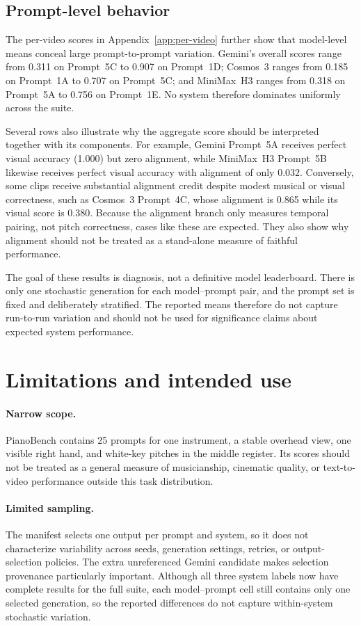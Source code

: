 \documentclass{article}
\begin{document}
\subsection{Prompt-level behavior}

The per-video scores in Appendix~\ref{app:per-video} further show that model-level means conceal large prompt-to-prompt variation. Gemini's overall scores range from 0.311 on Prompt~5C to 0.907 on Prompt~1D; Cosmos~3 ranges from 0.185 on Prompt~1A to 0.707 on Prompt~5C; and MiniMax~H3 ranges from 0.318 on Prompt~5A to 0.756 on Prompt~1E. No system therefore dominates uniformly across the suite.

Several rows also illustrate why the aggregate score should be interpreted together with its components. For example, Gemini Prompt~5A receives perfect visual accuracy (1.000) but zero alignment, while MiniMax~H3 Prompt~5B likewise receives perfect visual accuracy with alignment of only 0.032. Conversely, some clips receive substantial alignment credit despite modest musical or visual correctness, such as Cosmos~3 Prompt~4C, whose alignment is 0.865 while its visual score is 0.380. Because the alignment branch only measures temporal pairing, not pitch correctness, cases like these are expected. They also show why alignment should not be treated as a stand-alone measure of faithful performance.

The goal of these results is diagnosis, not a definitive model leaderboard. There is only one stochastic generation for each model--prompt pair, and the prompt set is fixed and deliberately stratified. The reported means therefore do not capture run-to-run variation and should not be used for significance claims about expected system performance.

\section{Limitations and intended use}
\label{sec:limitations}

\paragraph{Narrow scope.}
PianoBench contains 25 prompts for one instrument, a stable overhead view, one visible right hand, and white-key pitches in the middle register. Its scores should not be treated as a general measure of musicianship, cinematic quality, or text-to-video performance outside this task distribution.

\paragraph{Limited sampling.}
The manifest selects one output per prompt and system, so it does not characterize variability across seeds, generation settings, retries, or output-selection policies. The extra unreferenced Gemini candidate makes selection provenance particularly important. Although all three system labels now have complete results for the full suite, each model--prompt cell still contains only one selected generation, so the reported differences do not capture within-system stochastic variation.
\end{document}
